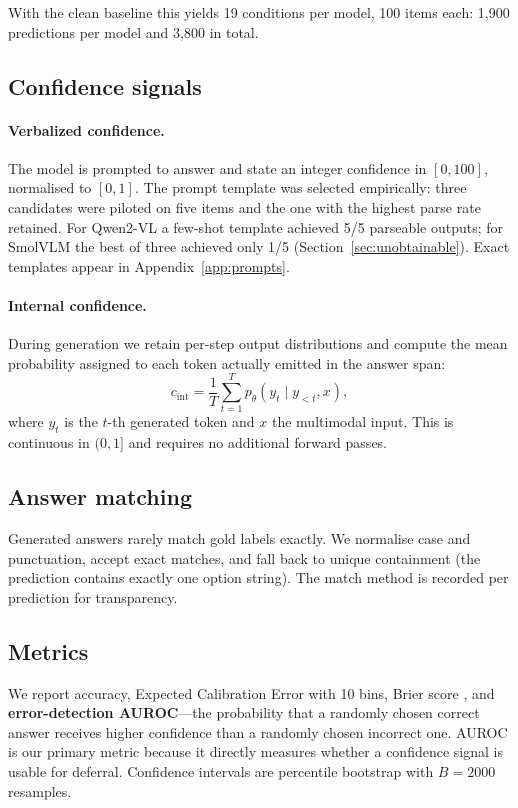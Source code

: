 \documentclass[11pt]{article}
\begin{document}
With the clean baseline this yields 19 conditions per model, 100 items each:
1{,}900 predictions per model and 3{,}800 in total.

\subsection{Confidence signals}

\paragraph{Verbalized confidence.} The model is prompted to answer and state an
integer confidence in $[0,100]$, normalised to $[0,1]$. The prompt template was
selected empirically: three candidates were piloted on five items and the one
with the highest parse rate retained. For Qwen2-VL a few-shot template achieved
5/5 parseable outputs; for SmolVLM the best of three achieved only 1/5
(Section~\ref{sec:unobtainable}). Exact templates appear in
Appendix~\ref{app:prompts}.

\paragraph{Internal confidence.} During generation we retain per-step output
distributions and compute the mean probability assigned to each token actually
emitted in the answer span:
\begin{equation}
c_{\text{int}} = \frac{1}{T}\sum_{t=1}^{T} p_\theta(y_t \mid y_{<t}, x),
\end{equation}
where $y_t$ is the $t$-th generated token and $x$ the multimodal input. This is
continuous in $(0,1]$ and requires no additional forward passes.

\subsection{Answer matching}

Generated answers rarely match gold labels exactly. We normalise case and
punctuation, accept exact matches, and fall back to unique containment (the
prediction contains exactly one option string). The match method is recorded per
prediction for transparency.

\subsection{Metrics}

We report accuracy, Expected Calibration Error \citep{naeini2015} with 10
bins, Brier score \citep{brier1950}, and
\textbf{error-detection AUROC}---the probability that a randomly chosen correct
answer receives higher confidence than a randomly chosen incorrect one. AUROC is
our primary metric because it directly measures whether a confidence signal is
usable for deferral. Confidence intervals are percentile bootstrap with
$B = 2000$ resamples.
\end{document}
